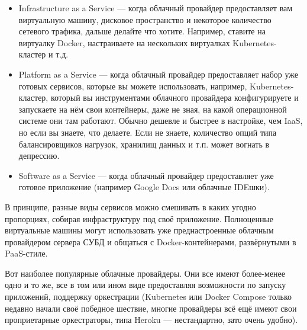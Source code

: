 \documentclass[a5paper]{article}
\begin{document}
\begin{itemize}
    \item Infrastructure as a Service --- когда облачный провайдер предоставляет вам виртуальную машину, дисковое пространство и некоторое количество сетевого трафика, дальше делайте что хотите. Например, ставите на виртуалку Docker, настраиваете на нескольких виртуалках Kubernetes-кластер и т.д.
    \item Platform as a Service --- когда облачный провайдер предоставляет набор уже готовых сервисов, которые вы можете использовать, например, Kubernetes-кластер, который вы инструментами облачного провайдера конфигурируете и запускаете на нём свои контейнеры, даже не зная, на какой операционной системе они там работают. Обычно дешевле и быстрее в настройке, чем IaaS, но если вы знаете, что делаете. Если не знаете, количество опций типа балансировщиков нагрузок, хранилищ данных и т.п. может вогнать в депрессию.
    \item Software as a Service --- когда облачный провайдер предоставляет уже готовое приложение (например Google Docs или облачные IDEшки).
\end{itemize}

В принципе, разные виды сервисов можно смешивать в каких угодно пропорциях, собирая инфраструктуру под своё приложение. Полноценные виртуальные машины могут использовать уже преднастроенные облачным провайдером сервера СУБД и общаться с Docker-контейнерами, развёрнутыми в PaaS-стиле.

Вот наиболее популярные облачные провайдеры. Они все имеют более-менее одно и то же, все в том или ином виде предоставляя возможности по запуску приложений, поддержку оркестрации (Kubernetes или Docker Compose только недавно начали своё победное шествие, многие провайдеры всё ещё имеют свои проприетарные оркестраторы, типа Heroku --- нестандартно, зато очень удобно). 
\end{document}
